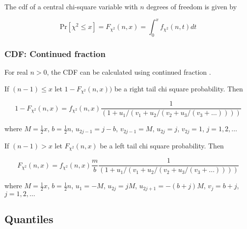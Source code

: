%
The cdf of a central chi-square variable with $n$ degrees of freedom is given by

\begin{equation}
	\text{Pr}\left[\chi^2 \le x\right] = F_{\chi^2}\left(n, x\right) =  \int_{0}^{x} f_{\chi^2}(n, t) dt
\end{equation}


\subsubsection{CDF: Continued fraction}
For real $n > 0$, the CDF can be calculated using  continued fraction \citep{peizerNormalPart1_1968}.

If $(n-1) \le x$ let $1- F_{\chi^2}\left(n, x\right))$ be a right tail chi square probability. Then

\begin{equation}
	1- F_{\chi^2}\left(n, x\right) = f_{\chi^2}(n, x)  \frac{1}{\left(1+u_1/(v_1 + u_2 / (v_2 + u_3 / (v_3 + \ldots ))) \right)}
\end{equation}

where $M = \tfrac{1}{2}x$, $b = \tfrac{1}{2}n$, $u_{2j-1} = j-b$, $v_{2j-1} = M$, $u_{2j}=j$, $v_{2j}=1$, $j=1,2,\ldots$ 


If $(n-1) > x$ let $ F_{\chi^2}\left(n, x\right)$ be a left tail chi square probability. Then

\begin{equation}
	F_{\chi^2}\left(n, x\right) = f_{\chi^2}(n, x)  \frac{m}{b}  \frac{1}{\left(1+u_1/(v_1 + u_2 / (v_2 + u_3 / (v_3 + \ldots ))) \right)}
\end{equation}

where $M = \tfrac{1}{2}x$, $b = \tfrac{1}{2}n$, $u_1 = -M$,  $u_{2j} = jM$, $u_{2j+1}=-(b+j)M$, $v_{j}=b+j$, $j=1,2,\ldots$ 






\subsection{Quantiles}
\label{ChiSquareDistributionQuantiles}


